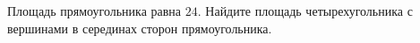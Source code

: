 \begin{ex}
	\begin{condition}
		Площадь прямоугольника равна \( 24 \). Найдите площадь четырехугольника с вершинами в серединах сторон прямоугольника.
	\end{condition}
\end{ex}